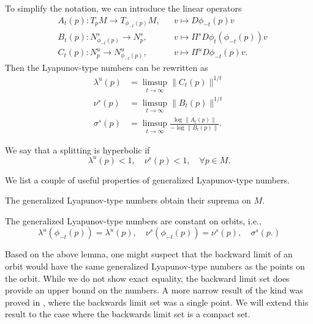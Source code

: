 To simplify the notation, we can introduce the linear operators
\begin{align*}
	&A_t(p) : T_pM \to T_{\phi_{-t}(p)} M, & &v\mapsto D\phi_{-t}(p) v \\
	&B_t(p) : N^s_{\phi_{-t}(p)} \to N^s_p, & &v\mapsto \Pi^s D\phi_t(\phi_{-t}(p)) v \\
	&C_t(p) : N^u_p \to N^u_{\phi_{-t}(p)}, & &v\mapsto \Pi^u D\phi_{-t}(p) v.
\end{align*}
Then the Lyapunov-type numbers can be rewritten as 
\begin{align*}
	\lambda^u(p) &= \limsup_{t\to\infty} \|C_t(p) \| ^{1/t} \\
	\nu^s(p) &= \limsup_{t\to\infty} \| B_t(p)\|^{1/t} \\
	\sigma^s(p) &= \limsup_{t\to\infty} \frac{ \log \| A_t(p) \|}{-\log\| B_t(p) \|}.
\end{align*}

We say that a splitting is hyperbolic if 
\begin{equation*}
	\lambda^u(p) < 1, \quad \nu^s(p) < 1, \quad \forall p \in M.
\end{equation*}

We list a couple of useful properties of generalized Lyapunov-type numbers.
\begin{lem}\cite[Lem.~4.1.1]{wiggins1994normally}
	The generalized Lyapunov-type numbers obtain their suprema on \(M\).
\end{lem}
\begin{lem}\cite[Lem.~3.1.2]{wiggins1994normally}
	The generalized Lyapunov-type numbers are constant on orbits, i.e., 
	\begin{equation*}
		\lambda^u(\phi_{-t}(p)) = \lambda^u(p), \quad \nu^s(\phi_{-t}(p)) = \nu^s(p), \quad \sigma^s(p.)
	\end{equation*}
\end{lem}

Based on the above lemma, one might suspect that the backward limit of an orbit would have the same generalized Lyapunov-type numbers as the points on the orbit. While we do not show exact equality, the backward limit set does provide an upper bound on the numbers. A more narrow result of the kind was proved in \cite[Thm.~2.3]{dieci1997lyapunov}, where the backwards limit set was a single point. We will extend this result to the case where the backwards limit set is a compact set.

